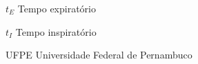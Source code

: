 \listoffigures*
\cleardoublepage

\def\lstlistlistingname{Lista de Códigos}
\lstlistoflistings
\cleardoublepage


\begin{siglas}
  \item[$t_E$] Tempo expiratório
  \item[$t_I$] Tempo inspiratório
  \item[UFPE] Universidade Federal de Pernambuco

\end{siglas}

